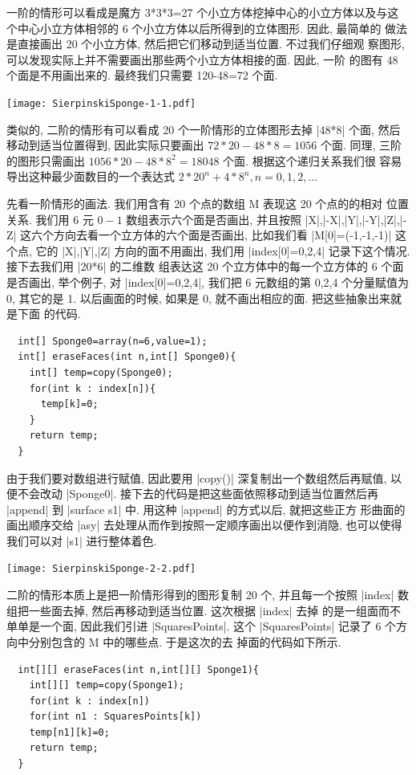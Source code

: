 \documentclass[nofonts,CJKnormalspaces]{ctexbook}
\begin{document}
一阶的情形可以看成是魔方 3*3*3=27 个小立方体挖掉中心的小立方体以及与这
个中心小立方体相邻的 6 个小立方体以后所得到的立体图形. 因此, 最简单的
做法是直接画出 20 个小立方体, 然后把它们移动到适当位置. 不过我们仔细观
察图形, 可以发现实际上并不需要画出那些两个小立方体相接的面. 因此, 一阶
的图有 48 个面是不用画出来的. 最终我们只需要 120-48=72 个面.
\begin{center}
  \texttt{[image: SierpinskiSponge-1-1.pdf]}
\end{center}%
类似的, 二阶的情形有可以看成 20 个一阶情形的立体图形去掉 |48*8| 个面,
然后移动到适当位置得到, 因此实际只要画出 $72*20-48*8=1056$ 个面. 同理,
三阶的图形只需画出 $1056*20-48*8^2=18048$ 个面. 根据这个递归关系我们很
容易导出这种最少面数目的一个表达式 $2*20^n+4*8^n, n=0,1,2,...$


先看一阶情形的画法. 我们用含有 20 个点的数组 M 表现这 20 个点的的相对
位置关系. 我们用 6 元 $0-1$ 数组表示六个面是否画出, 并且按照
|X|,|-X|,|Y|,|-Y|,|Z|,|-Z| 这六个方向去看一个立方体的六个面是否画出,
比如我们看 |M[0]=(-1,-1,-1)| 这个点, 它的 |X|,|Y|,|Z| 方向的面不用画出,
我们用 |index[0]={0,2,4}| 记录下这个情况. 接下去我们用 |20*6| 的二维数
组表达这 20 个立方体中的每一个立方体的 6 个面是否画出, 举个例子, 对
|index[0]={0,2,4}|, 我们把 6 元数组的第 0,2,4 个分量赋值为 0, 其它的是
1. 以后画面的时候, 如果是 0, 就不画出相应的面. 把这些抽象出来就是下面
的代码.
\begin{lstlisting}
  int[] Sponge0=array(n=6,value=1);
  int[] eraseFaces(int n,int[] Sponge0){
    int[] temp=copy(Sponge0);
    for(int k : index[n]){
      temp[k]=0;
    }
    return temp;
  }
\end{lstlisting}
由于我们要对数组进行赋值, 因此要用 |copy()| 深复制出一个数组然后再赋值,
以便不会改动 |Sponge0|. 接下去的代码是把这些面依照移动到适当位置然后再
|append| 到 |surface s1| 中. 用这种 |append| 的方式以后, 就把这些正方
形曲面的画出顺序交给 |asy| 去处理从而作到按照一定顺序画出以便作到消隐,
也可以使得我们可以对 |s1| 进行整体着色.


\begin{center}
  \texttt{[image: SierpinskiSponge-2-2.pdf]}
\end{center}
二阶的情形本质上是把一阶情形得到的图形复制 20 个, 并且每一个按照
|index| 数组把一些面去掉, 然后再移动到适当位置. 这次根据 |index| 去掉
的是一组面而不单单是一个面, 因此我们引进 |SquaresPoints|. 这个
|SquaresPoints| 记录了 6 个方向中分别包含的 M 中的哪些点. 于是这次的去
掉面的代码如下所示.
\begin{lstlisting}
  int[][] eraseFaces(int n,int[][] Sponge1){
    int[][] temp=copy(Sponge1);
    for(int k : index[n])
    for(int n1 : SquaresPoints[k])
    temp[n1][k]=0;
    return temp;
  }
\end{lstlisting}
\end{document}
